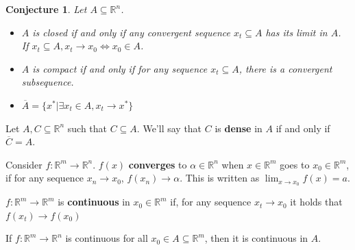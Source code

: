 \documentclass[aspectratio=169]{beamer}
\newtheorem{proposition}{Conjecture}[section]
\begin{document}
\begin{frame}

\begin{proposition}
    Let $A\subseteq\mathbb{R}^n$.
    \begin{itemize}
        \item $A$ is closed if and only if any convergent sequence $x_t\subseteq A$ has its limit in $A$. If $x_t\subseteq A, x_t\rightarrow x_0\Leftrightarrow x_0\in A$.
        \item $A$ is compact if and only if for any sequence $x_t\subseteq A$, there is a convergent subsequence.
        \item $\overline{A}=\{x^*|\exists x_t\in A, x_t\rightarrow x^*\}$
    \end{itemize}
\end{proposition}
    
\end{frame}

\begin{frame}
    \begin{definition}
    Let $A,C\subseteq \mathbb{R}^n$ such that $C\subseteq A$. We'll say that $C$ is \textbf{dense} in $A$ if and only if $\overline{C}=A$.
    \end{definition}
    
\end{frame}

\begin{frame}

    \begin{definition}
    Consider $f:\mathbb{R}^m\rightarrow\mathbb{R}^n$. $f(x)$ \textbf{converges} to $\alpha \in \mathbb{R}^n$ when $x\in\mathbb{R}^m$ goes to $x_0\in\mathbb{R}^m$, if for any sequence $x_n\rightarrow x_0$, $f(x_n)\rightarrow \alpha$. This is written as $\lim_{x\rightarrow x_0} f(x)=a$.
    \end{definition}
    
    \begin{definition}
    $f:\mathbb{R}^m\rightarrow\mathbb{R}^m$ is \textbf{continuous} in $x_0\in\mathbb{R}^m$ if, for any sequence $x_t\rightarrow x_0$ it holds that $f(x_t)\rightarrow f(x_0)$
    \end{definition}
    
    \begin{definition}
     If $f:\mathbb{R}^m\rightarrow \mathbb{R}^n$ is continuous for all $x_0\in A\subseteq \mathbb{R}^m$, then it is continuous in $A$.
    \end{definition}
\end{frame}
\end{document}
